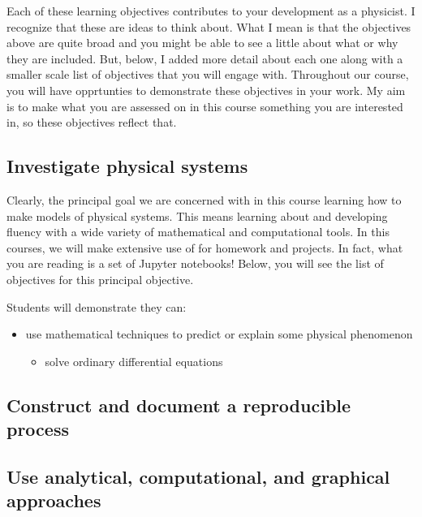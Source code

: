 \documentclass[letterpaper,10pt,english]{jupyterBook}
\begin{document}
\sphinxAtStartPar
Each of these learning objectives contributes to your development as a physicist. I recognize that these are  ideas to think about. What I mean is that the objectives above are quite broad and you might be able to see a little about what or why they are included. But, below, I added more detail about each one along with a smaller scale list of objectives that you will engage with. Throughout our course, you will have opprtunties to demonstrate these objectives in your work. My aim is to make what you are assessed on in this course something you are interested in, so these objectives reflect that.


\subsection{Investigate physical systems}
\label{\detokenize{content/0_course/goals:investigate-physical-systems}}
\sphinxAtStartPar
Clearly, the principal goal we are concerned with in this course learning how to make models of physical systems. This means learning about and developing fluency with a wide variety of mathematical and computational tools. In this courses, we will make extensive use of  for homework and projects. In fact, what you are reading is a set of Jupyter notebooks! Below, you will see the list of objectives for this principal objective.

\sphinxAtStartPar
Students will demonstrate they can:
\begin{itemize}
\item {} 
\sphinxAtStartPar
use mathematical techniques to predict or explain some physical phenomenon
\begin{itemize}
\item {} 
\sphinxAtStartPar
solve ordinary differential equations

\end{itemize}

\end{itemize}


\subsection{Construct and document a reproducible process}
\label{\detokenize{content/0_course/goals:construct-and-document-a-reproducible-process}}

\subsection{Use analytical, computational, and graphical approaches}
\label{\detokenize{content/0_course/goals:use-analytical-computational-and-graphical-approaches}}
\end{document}
